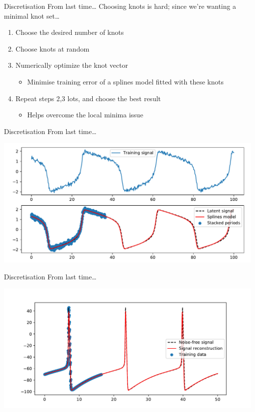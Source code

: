 \documentclass[presentation]{beamer}
\begin{document}
\begin{frame}[label={sec:orgc0d0104}]{Discretisation}
From last time\ldots{}
\vfill
Choosing knots is hard; since we're wanting a minimal knot set\ldots{}
\begin{enumerate}[<+->]
\item Choose the desired number of knots
\item Choose knots at random
\item Numerically optimize the knot vector
\begin{itemize}
\item Minimise training error of a splines model fitted with these knots
\end{itemize}
\item Repeat steps 2,3 lots, and choose the best result
\begin{itemize}
\item Helps overcome the local minima issue
\end{itemize}
\end{enumerate}
\end{frame}

\begin{frame}[label={sec:orged23246}]{Discretisation}
From last time\ldots{}

\begin{center}
\includegraphics[width=.9\linewidth]{./fit3.pdf}
\end{center}
\end{frame}

\begin{frame}[label={sec:orga4aada1}]{Discretisation}
From last time\ldots{}

\begin{center}
\includegraphics[width=.9\linewidth]{./HHFit2.pdf}
\end{center}
\end{frame}
\end{document}
